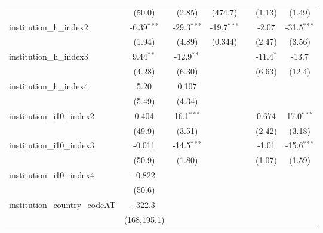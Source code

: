 \begin{tabular}{lcccccc}
                                         & (50.0)        & (2.85)        & (474.7)          &               & (1.13)        & (1.49)\\   
   institution\_h\_index2                & -6.39$^{***}$ & -29.3$^{***}$ & -19.7$^{***}$    &               & -2.07         & -31.5$^{***}$\\   
                                         & (1.94)        & (4.89)        & (0.344)          &               & (2.47)        & (3.56)\\   
   institution\_h\_index3                & 9.44$^{**}$   & -12.9$^{**}$  &                  &               & -11.4$^{*}$   & -13.7\\   
                                         & (4.28)        & (6.30)        &                  &               & (6.63)        & (12.4)\\   
   institution\_h\_index4                & 5.20          & 0.107         &                  &               &               &   \\   
                                         & (5.49)        & (4.34)        &                  &               &               &   \\   
   institution\_i10\_index2              & 0.404         & 16.1$^{***}$  &                  &               & 0.674         & 17.0$^{***}$\\   
                                         & (49.9)        & (3.51)        &                  &               & (2.42)        & (3.18)\\   
   institution\_i10\_index3              & -0.011        & -14.5$^{***}$ &                  &               & -1.01         & -15.6$^{***}$\\   
                                         & (50.9)        & (1.80)        &                  &               & (1.07)        & (1.59)\\   
   institution\_i10\_index4              & -0.822        &               &                  &               &               &   \\   
                                         & (50.6)        &               &                  &               &               &   \\   
   institution\_country\_codeAT          & -322.3        &               &                  &               &               &   \\   
                                         & (168,195.1)   &               &                  &               &               &   \\   

\end{tabular}
